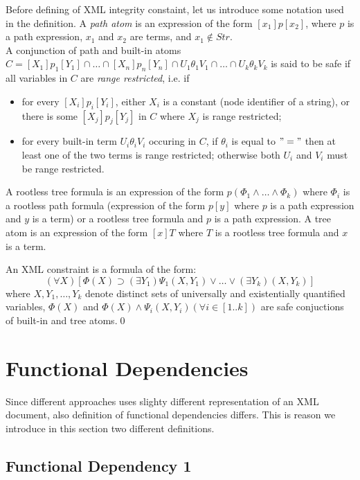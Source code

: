 Before defining of XML integrity constaint, let us introduce some notation used in the definition. A \emph{path atom} is an expression of the form $[x_1]p[x_2]$, where $p$ is a path expression, $x_1$ and $x_2$ are terms, and $x_1 \not \in Str$.\\
A conjunction of path and built-in atoms $C = [X_1]p_1[Y_1] \cap \dots \cap [X_n]p_n[Y_n] \cap U_1\theta_1 V_1 \cap \dots \cap U_k \theta_k V_k$ is said to be safe if all variables in $C$ are \emph{range restricted}, i.e. if
\begin{itemize}
 	\item for every $[X_i]p_i[Y_i]$, either $X_i$ is a constant (node identifier of a string), or there is some $[X_j]p_j[Y_j]$ in $C$ where $X_j$ is range restricted;
    \item for every built-in term $U_i\theta_i V_i$ occuring in $C$, if $\theta_i$ is equal to $"="$ then at least one of the two terms is range restricted; otherwise both $U_i$ and $V_i$ must be range restricted.
 \end{itemize}
A rootless tree formula is an expression of the form $p(\Phi_1 \land \dots \land \Phi_k)$ where $\Phi_i$ is a rootless path formula (expression of the form $p[y]$ where $p$ is a path expression and $y$ is a term) or a rootless tree formula and $p$ is a path expression. A tree atom is an expression of the form $[x]T$ where $T$ is a rootless tree formula and $x$ is a term.

\begin{define}\label{integConstr}
An XML constraint is a formula of the form: $$(\forall X)[\Phi(X)\supset (\exists Y_1)\Psi_1(X,Y_1) \lor \dots \lor (\exists Y_k)(X,Y_k)]$$
where $X,Y_1,\dots, Y_k$ denote distinct sets of universally and existentially quantified variables, $\Phi(X)$ and $\Phi(X) \land \Psi_i(X, Y_i) (\forall i \in [1..k])$ are safe conjuctions of built-in and tree atoms.\qed
\end{define}

\section{Functional Dependencies}

Since different approaches uses slighty different representation of an XML document, also definition of functional dependencies differs. This is reason we introduce in this section two different definitions.

\subsection{Functional Dependency 1}

